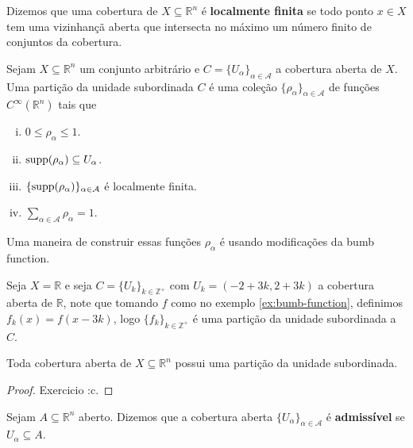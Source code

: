 \begin{definition}
  Dizemos que uma cobertura de $X\subseteq\mathbb{R}^{n}$ é \textbf{localmente finita} se todo ponto $x\in X$ tem uma vizinhançã aberta que intersecta no máximo um número finito de conjuntos da cobertura. 
\end{definition}
\begin{definition}
  Sejam $X\subseteq \mathbb{R}^{n}$ um conjunto arbitrário e $C=\{U_{\alpha}\}_{\alpha\in\mathcal{A}}$ a cobertura aberta de $X$.\\
  Uma partição da unidade subordinada $C$ é uma coleção $\{\rho_{\alpha}\}_{\alpha\in\mathcal{A}}$ de funções $C^{\infty}(\mathbb{R}^{n})$ tais que
  \begin{enumerate}[i)]
    \item $0\leq\rho_{\alpha}\leq 1$.
    \item $\operatorname{supp}(\rho_{\alpha})\subseteq U_{\alpha}$.
    \item $\{\operatorname{supp}(\rho_{\alpha})\}_{\alpha\in\mathcal{A}}$ é localmente finita.
    \item $\sum_{\alpha\in\mathcal{A}}\rho_{\alpha}=1$.
  \end{enumerate}
\end{definition}
\begin{note}
  Uma maneira de construir essas funções $\rho_{\alpha}$ é usando modificações da bumb function.
\end{note}
\begin{example}
  Seja $X=\mathbb{R}$ e seja $C=\{U_{k}\}_{k\in\mathbb{Z}^{+}}$ com $U_k=(-2+3k,2+3k)$ a cobertura aberta de $\mathbb{R}$, note que tomando $f$ como no exemplo \ref{ex:bumb-function}, definimos $f_k(x)=f(x-3k)$, logo $\{f_k\}_{k\in\mathbb{Z}^{+}}$ é uma partição da unidade subordinada a $C$.
  \begin{center}
    
  \end{center}
\end{example}
\begin{theorem}
  Toda cobertura aberta de $X\subseteq\mathbb{R}^{n}$ possui uma partição da unidade subordinada.
\end{theorem}
\begin{proof} 
  Exercicio :c.
\end{proof}
\begin{definition}
  Sejam $A\subseteq\mathbb{R}^{n}$ aberto. Dizemos que a cobertura aberta $\{U_{\alpha}\}_{\alpha\in\mathcal{A}}$ é \textbf{admissível} se $U_{\alpha}\subseteq A$. 
\end{definition}

